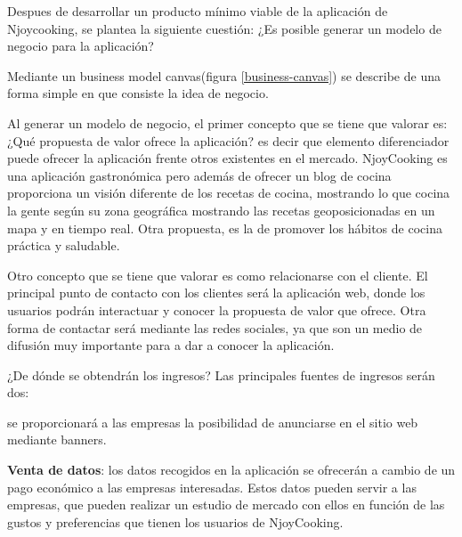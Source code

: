Despues de desarrollar un producto mínimo viable de la aplicación de Njoycooking, se plantea la siguiente cuestión: ¿Es posible generar un modelo de negocio para la aplicación?

Mediante un business model canvas(figura \ref{business-canvas}) se describe de una forma simple en que consiste la idea de negocio.

\vspace{5 mm}

Al generar un modelo de negocio, el primer concepto que se tiene que valorar es: ¿Qué propuesta de valor ofrece la aplicación? es decir que elemento diferenciador puede ofrecer la aplicación frente otros existentes en el mercado. NjoyCooking es una aplicación gastronómica pero además de ofrecer un blog de cocina proporciona un visión diferente de los recetas de cocina, mostrando lo que cocina la gente según su zona geográfica mostrando las recetas geoposicionadas en un mapa y en tiempo real. Otra propuesta, es la de promover los hábitos de cocina práctica y saludable. 


\vspace{5 mm}

Otro concepto que se tiene que valorar es como relacionarse con el cliente. El principal punto de contacto con los clientes será la aplicación web, donde los usuarios podrán interactuar y conocer la propuesta de valor que ofrece. Otra forma de contactar será mediante las redes sociales, ya que son un medio de difusión muy importante para a dar a conocer la aplicación.

\vspace{5 mm}

¿De dónde se obtendrán los ingresos? Las principales fuentes de ingresos serán dos:

\begin{description}

\item [Publicidad:] se proporcionará a las empresas la posibilidad de anunciarse en el sitio web mediante banners.

\item \textbf{Venta de datos}: los datos recogidos en la aplicación se ofrecerán a cambio de un pago económico a las empresas interesadas. Estos datos pueden servir a las empresas, que pueden realizar un estudio de mercado con ellos en función de las gustos y preferencias que tienen los usuarios de NjoyCooking.

\end{description} 


